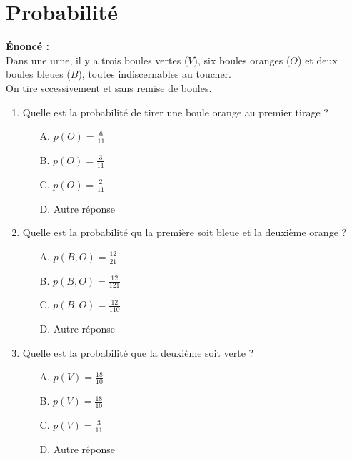 \documentclass{article}
\begin{document}
\newpage
\section{\textbf{Probabilité}} 
\textbf{Énoncé :} \\
Dans une urne, il y a trois boules vertes (\(V\)), six boules oranges (\(O\)) et deux boules bleues (\(B\)),
toutes indiscernables au toucher. \\
On tire sccessivement et sans remise de boules.

\begin{enumerate}[label=\textbf{Question \arabic*.}]
    \item Quelle est la probabilité de tirer une boule orange au premier tirage ?
    \vspace{0.5cm} 
    
    \begin{itemize}[label=]
        \item[A.] \( p(O) = \frac{6}{11} \) \vspace{0.5cm} 
        \item[B.] \( p(O) = \frac{3}{11} \) \vspace{0.5cm} 
        \item[C.] \( p(O) = \frac{2}{11} \) \vspace{0.5cm} 
        \item[D.] Autre réponse
    \end{itemize}
    \vspace{0.5cm} 
    
    \item Quelle est la probabilité qu la première soit bleue et la deuxième orange ?
    \vspace{0.5cm}
    
    \begin{itemize}[label=]
        \item[A.] \( p(B,O) = \frac{12}{21} \) \vspace{0.5cm} 
        \item[B.] \( p(B,O) = \frac{12}{121} \) \vspace{0.5cm} 
        \item[C.] \( p(B,O) = \frac{12}{110} \) \vspace{0.5cm} 
        \item[D.] Autre réponse
    \end{itemize}
    \vspace{0.5cm} 
    
    \item Quelle est la probabilité que la deuxième soit verte ?
    \vspace{0.5cm}
    \begin{itemize}[label=]
        \item[A.] \( p(V) = \frac{18}{10} \) \vspace{0.5cm} 
        \item[B.] \( p(V) = \frac{18}{10} \) \vspace{0.5cm} 
        \item[C.] \( p(V) = \frac{3}{11} \) \vspace{0.5cm} 
        \item[D.] Autre réponse
    \end{itemize}
\end{enumerate}
\end{document}
